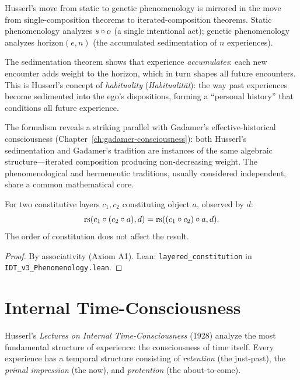 \begin{interpretation}
\label{interp:genetic-turn}
Husserl's move from static to genetic phenomenology is mirrored in the move
from single-composition theorems to iterated-composition theorems. Static
phenomenology analyzes $s \circ o$ (a single intentional act); genetic
phenomenology analyzes $\mathrm{horizon}(e, n)$ (the accumulated sedimentation
of $n$ experiences).

The sedimentation theorem shows that experience \emph{accumulates}: each new
encounter adds weight to the horizon, which in turn shapes all future
encounters. This is Husserl's concept of \emph{habituality}
(\textit{Habitualit\"at}): the way past experiences become sedimented into
the ego's dispositions, forming a ``personal history'' that conditions all
future experience.

The formalism reveals a striking parallel with Gadamer's effective-historical
consciousness (Chapter~\ref{ch:gadamer-consciousness}): both Husserl's
sedimentation and Gadamer's tradition are instances of the same algebraic
structure---iterated composition producing non-decreasing weight. The
phenomenological and hermeneutic traditions, usually considered independent,
share a common mathematical core.
\end{interpretation}

\begin{theorem}
\label{thm:layered-constitution}
For two constitutive layers $c_1, c_2$ constituting object $a$, observed by $d$:
\[
\mathrm{rs}(c_1 \circ (c_2 \circ a), d) = \mathrm{rs}((c_1 \circ c_2) \circ a, d).
\]
The order of constitution does not affect the result.
\end{theorem}

\begin{proof}
By associativity (Axiom A1).
Lean: \texttt{layered\_constitution} in \texttt{IDT\_v3\_Phenomenology.lean}.
\end{proof}

\section{Internal Time-Consciousness}

Husserl's \textit{Lectures on Internal Time-Consciousness} (1928) analyze the
most fundamental structure of experience: the consciousness of time itself.
Every experience has a temporal structure consisting of \emph{retention}
(the just-past), the \emph{primal impression} (the now), and \emph{protention}
(the about-to-come).

